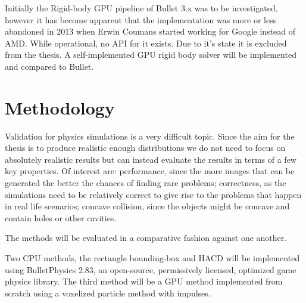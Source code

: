 Initially the Rigid-body GPU pipeline of Bullet 3.x was to be investigated, however
it has become apparent that the implementation was more or less abandoned in 2013
when Erwin Coumans started working for Google instead of AMD. While operational,
no API for it exists. Due to it's state it is excluded from the thesis.
A self-implemented GPU rigid body solver will be implemented and compared to Bullet.

\section{Methodology}
Validation for physics simulations is a very difficult topic. Since the aim for
the thesis is to produce realistic enough distributions we do not need to focus
on absolutely realistic results but can instead evaluate the results in terms of
a few key properties. Of interest are: performance, since the more images
that can be generated the better the chances of finding rare problems; correctness,
as the simulations need to be relatively correct to give rise to the problems that
 happen in real life scenarios; concave collision, since the objects might
 be concave and contain holes or other cavities.

The methods will be evaluated in a comparative fashion against one another.

Two CPU methods, the rectangle bounding-box and HACD will be implemented using
BulletPhysics 2.83, an open-source, permissively licensed, optimized game physics
library. The third method will be a GPU method implemented from scratch using a
voxelized particle method with impulses.
